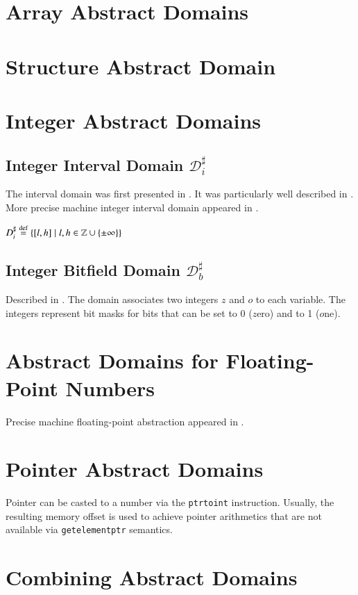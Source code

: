 \documentclass[a4paper]{book}
\begin{document}
\section{Array Abstract Domains}

\section{Structure Abstract Domain}

\section{Integer Abstract Domains}

\subsection{Integer Interval Domain $\mathcal{D}_i^\sharp$}

The interval domain was first presented in \cite{CC76}.  It was
particularly well described in \cite{M04}. More precise machine
integer interval domain appeared in \cite{M12}.

$D_i^\sharp \buildrel \text{d{}ef}\over = \{ [ l,h ] \mid l, h \in
\mathbb{Z} \cup \{ \pm\infty \} \}$

\subsection{Integer Bitfield Domain $\mathcal{D}_b^\sharp$}

Described in \cite{M12}.  The domain associates two integers $z$ and
$o$ to each variable. The integers represent bit masks for bits that
can be set to 0 ($z$ero) and to 1 ($o$ne).

\section{Abstract Domains for Floating-Point Numbers}
Precise machine floating-point abstraction appeared in \cite{M12}.

\section{Pointer Abstract Domains}
Pointer can be casted to a number via the \texttt{ptrtoint}
instruction.  Usually, the resulting memory offset is used to achieve
pointer arithmetics that are not available via \texttt{getelementptr}
semantics.

\section{Combining Abstract Domains}
\end{document}
